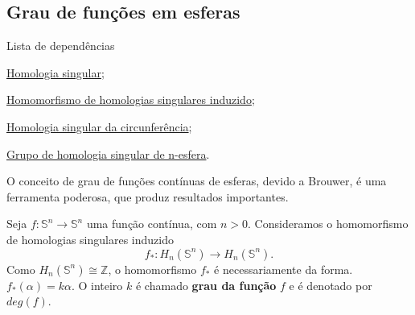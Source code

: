 \subsection{Grau de funções em esferas} %
\label{grau-de-funcoes-em-esferas-def}
\begin{titlemize}{Lista de dependências}
    \item \hyperref[homologia-singular-def]{Homologia singular};\\
    \item \hyperref[homomorfismo-de-homologias-singulares-induzido-prop]{Homomorfismo de homologias singulares induzido};\\
    \item \hyperref[homologia-singular-de-S1-prop]{Homologia singular da circunferência};\\
    \item \hyperref[grupo-de-homologia-singular-de-n-esfera-prop]{Grupo de homologia singular de n-esfera}.
\end{titlemize}

O conceito de grau de funções contínuas de esferas, devido a Brouwer, é uma ferramenta poderosa, que produz resultados importantes.

\begin{defi}
    Seja $f:\mathbb{S}^n\rightarrow \mathbb{S}^n$ uma função contínua, com $n>0$. Consideramos o homomorfismo de homologias singulares induzido
    \[f_*:H_n(\mathbb{S}^n)\rightarrow H_n(\mathbb{S}^n).\]
    Como $H_n(\mathbb{S}^n)\cong \mathbb{Z}$, o homomorfismo $f_*$ é necessariamente da forma. $f_*(\alpha)=k\alpha$. O inteiro $k$ é chamado \textbf{grau da função} $f$ e é denotado por $deg(f)$.
\end{defi}

